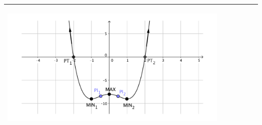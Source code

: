 \begin{center}
\begin{longtable}[h]{|p{}|p{}|p{}|}
{			\begin{center}
				\includegraphics*[width=0.9\textwidth]{img-07/chap-deriv-polinomica2.pdf}
			\end{center}
		}
		\\  [1.5ex] \hline 
	\end{longtable}
\end{center}
\pagebreak


